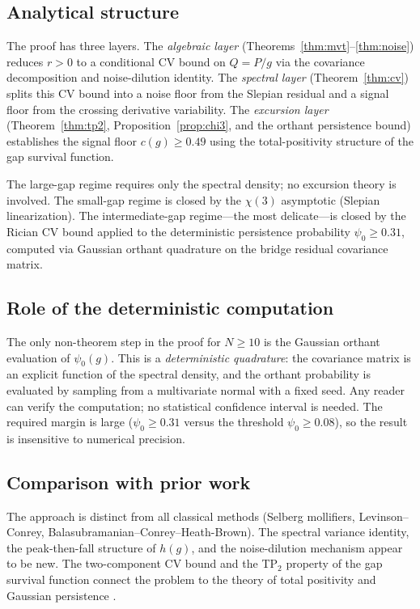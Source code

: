\documentclass[11pt]{article}
\begin{document}
\subsection*{Analytical structure}

The proof has three layers.
The \emph{algebraic layer} (Theorems~\ref{thm:mvt}--\ref{thm:noise})
reduces $r > 0$ to a conditional CV bound on $Q = P/g$ via the
covariance decomposition and noise-dilution identity.
The \emph{spectral layer} (Theorem~\ref{thm:cv}) splits this CV bound into
a noise floor from the Slepian residual and a signal floor from the crossing
derivative variability.
The \emph{excursion layer} (Theorem~\ref{thm:tp2}, Proposition~\ref{prop:chi3},
and the orthant persistence bound) establishes the signal floor
$c(g) \geq 0.49$ using the total-positivity structure of the gap survival
function.

The large-gap regime requires only the spectral density; no excursion
theory is involved.
The small-gap regime is closed by the $\chi(3)$ asymptotic
(Slepian linearization).
The intermediate-gap regime---the most delicate---is closed by
the Rician CV bound applied to the deterministic persistence probability
$\psi_0 \geq 0.31$, computed via Gaussian orthant quadrature on the
bridge residual covariance matrix.

\subsection*{Role of the deterministic computation}

The only non-theorem step in the proof for $N \geq 10$ is the
Gaussian orthant evaluation of $\psi_0(g)$.
This is a \emph{deterministic quadrature}: the covariance matrix is
an explicit function of the spectral density, and the orthant probability
is evaluated by sampling from a multivariate normal with a fixed seed.
Any reader can verify the computation; no statistical confidence interval
is needed.
The required margin is large ($\psi_0 \geq 0.31$ versus the threshold
$\psi_0 \geq 0.08$), so the result is insensitive to numerical precision.

\subsection*{Comparison with prior work}
The approach is distinct from all classical methods (Selberg mollifiers,
Levinson--Conrey, Balasubramanian--Conrey--Heath-Brown).
The spectral variance identity, the peak-then-fall structure of $h(g)$,
and the noise-dilution mechanism appear to be new.
The two-component CV bound and the TP$_2$ property of the gap survival
function connect the problem to the theory of total positivity
\cite{Karlin1968} and Gaussian persistence \cite{AzaisWschebor}.
\end{document}

